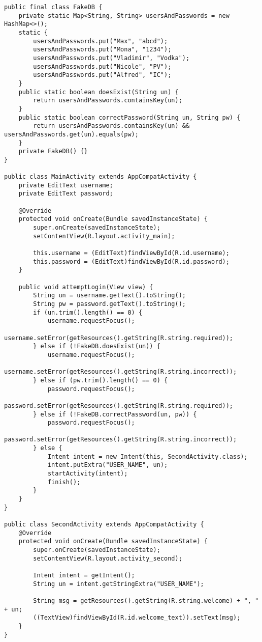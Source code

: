 \begin{lstlisting}[style=A_JAVA, caption={A very simple login}, label={listing:loginjava}]
public final class FakeDB {
    private static Map<String, String> usersAndPasswords = new HashMap<>();
    static {
        usersAndPasswords.put("Max", "abcd");
        usersAndPasswords.put("Mona", "1234");
        usersAndPasswords.put("Vladimir", "Vodka");
        usersAndPasswords.put("Nicole", "PV");
        usersAndPasswords.put("Alfred", "IC");
    }
    public static boolean doesExist(String un) {
        return usersAndPasswords.containsKey(un);
    }
    public static boolean correctPassword(String un, String pw) {
        return usersAndPasswords.containsKey(un) && usersAndPasswords.get(un).equals(pw);
    }
    private FakeDB() {}
}

public class MainActivity extends AppCompatActivity {
    private EditText username;
    private EditText password;

    @Override
    protected void onCreate(Bundle savedInstanceState) {
        super.onCreate(savedInstanceState);
        setContentView(R.layout.activity_main);

        this.username = (EditText)findViewById(R.id.username);
        this.password = (EditText)findViewById(R.id.password);
    }

    public void attemptLogin(View view) {
        String un = username.getText().toString();
        String pw = password.getText().toString();
        if (un.trim().length() == 0) {
            username.requestFocus();
            username.setError(getResources().getString(R.string.required));
        } else if (!FakeDB.doesExist(un)) {
            username.requestFocus();
            username.setError(getResources().getString(R.string.incorrect));
        } else if (pw.trim().length() == 0) {
            password.requestFocus();
            password.setError(getResources().getString(R.string.required));
        } else if (!FakeDB.correctPassword(un, pw)) {
            password.requestFocus();
            password.setError(getResources().getString(R.string.incorrect));
        } else {
            Intent intent = new Intent(this, SecondActivity.class);
            intent.putExtra("USER_NAME", un);
            startActivity(intent);
            finish();
        }
    }
}

public class SecondActivity extends AppCompatActivity {
    @Override
    protected void onCreate(Bundle savedInstanceState) {
        super.onCreate(savedInstanceState);
        setContentView(R.layout.activity_second);

        Intent intent = getIntent();
        String un = intent.getStringExtra("USER_NAME");

        String msg = getResources().getString(R.string.welcome) + ", " + un;
        ((TextView)findViewById(R.id.welcome_text)).setText(msg);
    }
}
\end{lstlisting}

